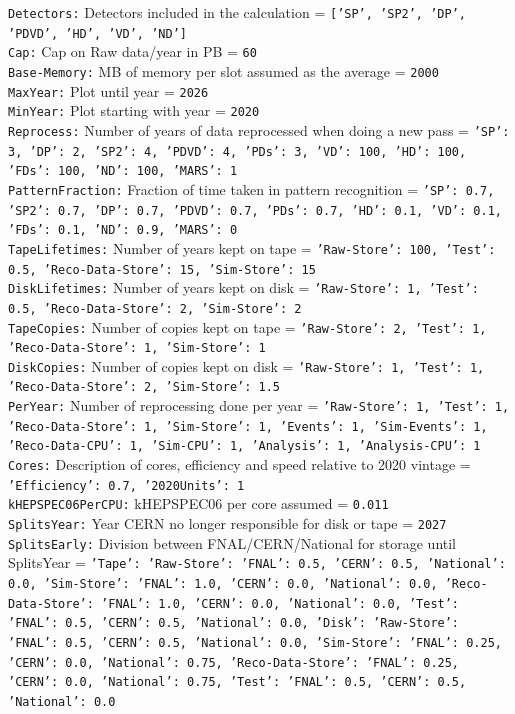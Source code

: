 {\tt Detectors:} Detectors included in the calculation = {\tt ['SP', 'SP2', 'DP', 'PDVD', 'HD', 'VD', 'ND']} \\
{\tt Cap:} Cap on Raw data/year in PB = {\tt 60} \\
{\tt Base-Memory:} MB of memory per slot assumed as the average = {\tt 2000} \\
{\tt MaxYear:} Plot until year = {\tt 2026} \\
{\tt MinYear:} Plot starting with year = {\tt 2020} \\
{\tt Reprocess:} Number of years of data reprocessed when doing a new pass = {\tt {'SP': 3, 'DP': 2, 'SP2': 4, 'PDVD': 4, 'PDs': 3, 'VD': 100, 'HD': 100, 'FDs': 100, 'ND': 100, 'MARS': 1}} \\
{\tt PatternFraction:} Fraction of time taken in pattern recognition = {\tt {'SP': 0.7, 'SP2': 0.7, 'DP': 0.7, 'PDVD': 0.7, 'PDs': 0.7, 'HD': 0.1, 'VD': 0.1, 'FDs': 0.1, 'ND': 0.9, 'MARS': 0}} \\
{\tt TapeLifetimes:} Number of years kept on tape = {\tt {'Raw-Store': 100, 'Test': 0.5, 'Reco-Data-Store': 15, 'Sim-Store': 15}} \\
{\tt DiskLifetimes:} Number of years kept on disk = {\tt {'Raw-Store': 1, 'Test': 0.5, 'Reco-Data-Store': 2, 'Sim-Store': 2}} \\
{\tt TapeCopies:} Number of copies kept on tape = {\tt {'Raw-Store': 2, 'Test': 1, 'Reco-Data-Store': 1, 'Sim-Store': 1}} \\
{\tt DiskCopies:} Number of copies kept on disk = {\tt {'Raw-Store': 1, 'Test': 1, 'Reco-Data-Store': 2, 'Sim-Store': 1.5}} \\
{\tt PerYear:} Number of reprocessing done per year = {\tt {'Raw-Store': 1, 'Test': 1, 'Reco-Data-Store': 1, 'Sim-Store': 1, 'Events': 1, 'Sim-Events': 1, 'Reco-Data-CPU': 1, 'Sim-CPU': 1, 'Analysis': 1, 'Analysis-CPU': 1}} \\
{\tt Cores:} Description of cores, efficiency and speed relative to 2020 vintage = {\tt {'Efficiency': 0.7, '2020Units': 1}} \\
{\tt kHEPSPEC06PerCPU:} kHEPSPEC06 per core assumed = {\tt 0.011} \\
{\tt SplitsYear:} Year CERN no longer responsible for disk or tape = {\tt 2027} \\
{\tt SplitsEarly:} Division between FNAL/CERN/National for storage until SplitsYear = {\tt {'Tape': {'Raw-Store': {'FNAL': 0.5, 'CERN': 0.5, 'National': 0.0}, 'Sim-Store': {'FNAL': 1.0, 'CERN': 0.0, 'National': 0.0}, 'Reco-Data-Store': {'FNAL': 1.0, 'CERN': 0.0, 'National': 0.0}, 'Test': {'FNAL': 0.5, 'CERN': 0.5, 'National': 0.0}}, 'Disk': {'Raw-Store': {'FNAL': 0.5, 'CERN': 0.5, 'National': 0.0}, 'Sim-Store': {'FNAL': 0.25, 'CERN': 0.0, 'National': 0.75}, 'Reco-Data-Store': {'FNAL': 0.25, 'CERN': 0.0, 'National': 0.75}, 'Test': {'FNAL': 0.5, 'CERN': 0.5, 'National': 0.0}}}} \\
